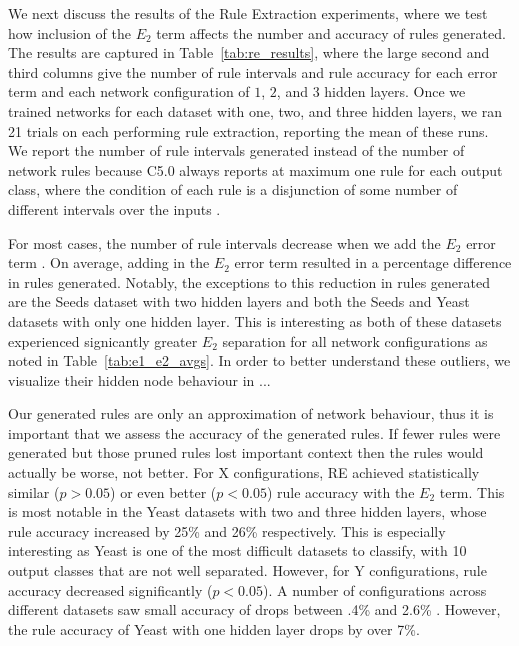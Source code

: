 We next discuss the results of the Rule Extraction experiments,
where we test how inclusion of the $E_2$ term affects the number
and accuracy of rules generated.
The results are
captured in Table~\ref{tab:re_results}, where the large second and
third columns
give the number of rule intervals and rule accuracy for each error term and
each network configuration of $1$, $2$, and $3$ hidden layers.
Once we trained networks for each dataset with
one, two, and three hidden layers, we ran 21 trials on each performing
rule extraction, reporting the mean of these runs. We report the
number of rule intervals generated instead of the number of network
rules because C5.0 always reports at maximum one rule for each output
class, where the condition of each rule is a disjunction of some number
of different intervals over the inputs .

For most cases, the number of rule intervals decrease when we add
the $E_2$ error term .
On average, adding in the $E_2$ error term resulted in a
percentage difference in rules generated.
Notably, the exceptions to this reduction in rules generated are
the Seeds dataset with two hidden layers and both the
Seeds and Yeast datasets with only one
hidden layer. This is interesting as both of these datasets
experienced signicantly greater $E_2$ separation for all network
configurations as noted in Table~\ref{tab:e1_e2_avgs}. In order
to better understand these outliers, we visualize their hidden node
behaviour in ...


Our generated rules are only an approximation of network behaviour,
thus it is important that we assess the accuracy of the generated rules.
If fewer rules were generated but those pruned rules
lost important context then the rules would actually be worse, not better.
For X  configurations, RE achieved
statistically similar ($p > 0.05$) or even better ($p < 0.05$)
rule accuracy with the $E_2$ term. This is most
notable in the Yeast datasets with two and three hidden layers, whose rule
accuracy increased by 25\% and 26\% respectively. This is especially interesting
as Yeast is one of the most difficult datasets to classify, with 10 output
classes that are not well separated. However, for Y
 configurations, rule accuracy decreased
significantly ($p < 0.05$). 
A number of configurations across different datasets saw small
accuracy of drops between .4\% and 2.6\%
.
However, the rule accuracy of Yeast with one hidden layer drops by over 7\%.

